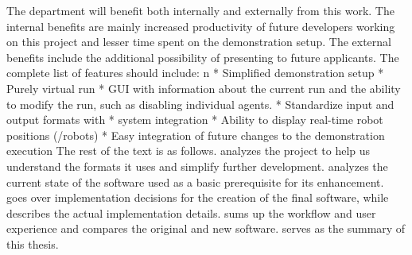 The department will benefit both internally and externally from this work. The internal benefits are mainly increased productivity of future developers working on this project and lesser time spent on the demonstration setup. The external benefits include the additional possibility of presenting to future applicants.
The complete list of features should include:
\begitems \style n
    * Simplified demonstration setup
    * Purely virtual run
    * GUI with information about the current run and the ability to modify the run, such as disabling individual agents. 
    * Standardize input and output formats with \mapfIR
    * {\vicon} system integration
    * Ability to display real-time robot positions ({\vicon}/robots)
    * Easy integration of future changes to the demonstration execution
\enditems
\br
The rest of the text is as follows.\br
{} analyzes the {\mapfIR} project to help us understand the formats it uses and simplify further development. {} analyzes the current state of the software used as a basic prerequisite for its enhancement. {} goes over implementation decisions for the creation of the final software, while {} describes the actual implementation details. {} sums up the workflow and user experience and compares the original and new software. {} serves as the summary of this thesis.